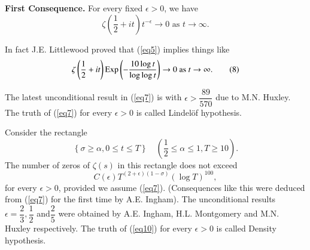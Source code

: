 \medskip
\noindent\textbf{First Consequence.} For every fixed $\epsilon >0$, we have
\begin{equation*}
\zeta(\frac{1}{2} + it) t^{-\epsilon} \to 0 \text{ as } t \to \infty.  \tag{7}\label{eq7}
\end{equation*}

\begin{remark}%
In fact J.E. Littlewood proved that (\ref{eq5}) implies things like
\begin{equation*}
\zeta \left(\frac{1}{2} + it \right) \operatorname{Exp} \left( -\frac{10 \log t}{\log \log t}\right) \to 0 \text{ as } t \to \infty. \tag{8}\label{eq8}
\end{equation*}
\end{remark}

\begin{remark}%
The latest unconditional result in (\ref{eq7}) is with $\epsilon > \dfrac{89}{570}$ due to M.N. Huxley. The truth of (\ref{eq7}) for every $\epsilon > 0$ is called Lindel\"of hypothesis. 
\end{remark}

\medskip
{} Consider the rectangle
\begin{equation*}
\left\{\sigma \geq \alpha,   0 \leq t \leq T\right\} \quad \left( \frac{1}{2} \leq \alpha \leq 1, T \geq 10 \right). \tag{9}\label{eq9}
\end{equation*}
The number of zeros of $\zeta(s)$ in this rectangle does not exceed
\begin{equation*}
C(\epsilon) T^{(2+ \epsilon) (1-\sigma)} (\log T)^{100},\tag{10}\label{eq10}
\end{equation*}
for every $\epsilon > 0$, provided we assume (\ref{eq7}). (Consequences like this were deduced from (\ref{eq7}) for the first time by A.E. Ingham). The unconditional results $\epsilon = \dfrac{2}{3}, \dfrac{1}{2}$ and\pageoriginale $\dfrac{2}{5}$ were obtained by A.E. Ingham, H.L. Montgomery and M.N. Huxley respectively. The truth of (\ref{eq10}) for every $\epsilon > 0$ is called Density hypothesis.

